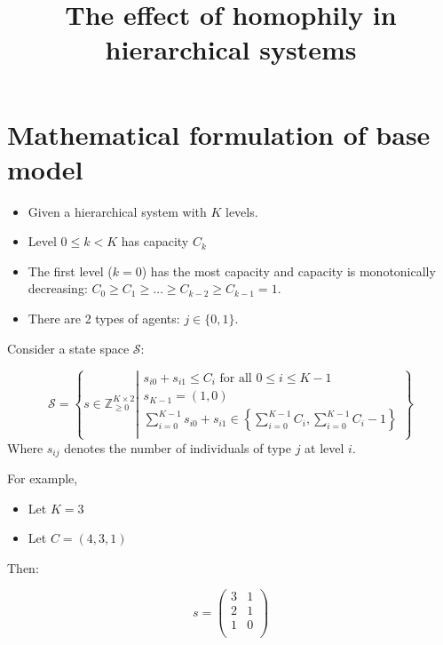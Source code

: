 \documentclass{article}
\title{The effect of homophily in hierarchical systems}
\renewcommand{\S}{\mathcal{S}}
\begin{document}
\maketitle


\section{Mathematical formulation of base model}

\begin{itemize}
    \item Given a hierarchical system with \(K\) levels.
    \item Level \(0\leq k < K\) has capacity \(C_k\)
    \item The first level (\(k=0\)) has the most capacity and capacity is
        monotonically decreasing: \(C_0 \geq C_1 \geq \dots \geq C_{k-2} \geq C_{k-1} = 1\).
    \item There are 2 types of agents: \(j\in\{0, 1\}\).
\end{itemize}

Consider a state space \(\S\):

\begin{equation}\label{eqn:state_space}
    \S = \left\{s \in \mathbb{Z} ^ {K \times 2} _ {\geq 0}\left|
        \begin{array}{l}
        s_{i0} + s_{i1} \leq C_i\text{ for all }0\leq i \leq K - 1\\
        s_{K-1} = (1, 0)\\
        \sum_{i=0}^{K - 1}s_{i0} + s_{i1} \in\left\{\sum_{i=0}^{K - 1}C_i, \sum_{i=0}^{K - 1}C_i - 1\right\}\\

        \end{array}
                \right.\right\}
\end{equation}
Where \(s_{ij}\) denotes the number of individuals of type \(j\) at level \(i\).

For example,

\begin{itemize}
    \item Let \(K = 3\)
    \item Let \(C = (4, 3, 1)\)
\end{itemize}

Then:

\[
    s = \begin{pmatrix}
        3 & 1 \\
        2 & 1 \\
        1 & 0 \\
    \end{pmatrix}
\]
\end{document}

